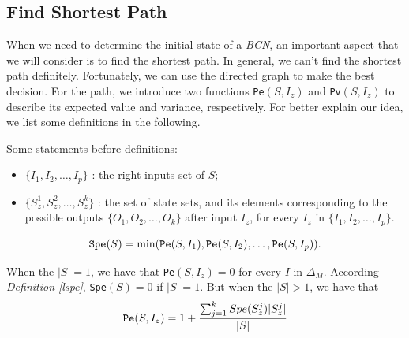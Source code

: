 \subsection{Find Shortest Path}
When we need to determine the initial state of a {\em BCN}, an important aspect that we will consider is to find the shortest path. In general, we can't find the shortest path definitely.  Fortunately, we can use the directed graph to make the best decision. For the path, we introduce two functions {\tt Pe}$(S, I_z)$ and {\tt Pv}$(S, I_z)$ to describe its expected value and variance, respectively. For better explain our idea, we list some definitions in the following.


Some statements before definitions:
\begin{itemize}
  \item $\{I_1,I_2,\ldots, I_p\}$ : the right inputs set of $S$;
  \item $\{S_z^1,S_z^2,\ldots, S_z^k\}$ : the set of state sets, and its elements corresponding to the possible outputs $\{O_1,O_2,\ldots,O_k\}$ after input $I_z$, for every $I_z$ in $\{I_1,I_2,\ldots, I_p\}$.
\end{itemize} 
\begin{definition}[{\tt Spe}$(S)$] \label{lspe}
 \[{\tt Spe}(S)= \min({\tt Pe}(S, I_1),{\tt Pe}(S, I_2),\ldots,{\tt Pe}(S, I_p)).\] 
\end{definition}

\begin{definition}[{\tt Pe}$(S, I_z)$] 
When the $|S|=1$, we have that
{\tt Pe}$(S, I_z)=0$  for every $I$ in $\Delta_M$. According {\em Definition \ref{lspe}}, {\tt Spe}$(S)=0$ if $|S|=1$. But when the $|S|>1$, 
we have that  
\[{\tt Pe}(S, I_z)=1 +\frac{\sum_{j=1}^k Spe(S_z^j)|S_z^j|}{ |S|}\] 
\end{definition}

